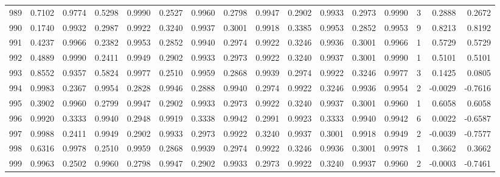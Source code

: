 \begin{tabular}{lrrrrrrrrrrrrrrr}
989 &      0.7102 &  0.9774 &  0.5298 &  0.9990 &  0.2527 &  0.9960 &  0.2798 &  0.9947 &  0.2902 &  0.9933 &   0.2973 &     0.9990 &      3 &                    0.2888 &                     0.2672 \\
990 &      0.1740 &  0.9932 &  0.2987 &  0.9922 &  0.3240 &  0.9937 &  0.3001 &  0.9918 &  0.3385 &  0.9953 &   0.2852 &     0.9953 &      9 &                    0.8213 &                     0.8192 \\
991 &      0.4237 &  0.9966 &  0.2382 &  0.9953 &  0.2852 &  0.9940 &  0.2974 &  0.9922 &  0.3246 &  0.9936 &   0.3001 &     0.9966 &      1 &                    0.5729 &                     0.5729 \\
992 &      0.4889 &  0.9990 &  0.2411 &  0.9949 &  0.2902 &  0.9933 &  0.2973 &  0.9922 &  0.3240 &  0.9937 &   0.3001 &     0.9990 &      1 &                    0.5101 &                     0.5101 \\
993 &      0.8552 &  0.9357 &  0.5824 &  0.9977 &  0.2510 &  0.9959 &  0.2868 &  0.9939 &  0.2974 &  0.9922 &   0.3246 &     0.9977 &      3 &                    0.1425 &                     0.0805 \\
994 &      0.9983 &  0.2367 &  0.9954 &  0.2828 &  0.9946 &  0.2888 &  0.9940 &  0.2974 &  0.9922 &  0.3246 &   0.9936 &     0.9954 &      2 &                   -0.0029 &                    -0.7616 \\
995 &      0.3902 &  0.9960 &  0.2799 &  0.9947 &  0.2902 &  0.9933 &  0.2973 &  0.9922 &  0.3240 &  0.9937 &   0.3001 &     0.9960 &      1 &                    0.6058 &                     0.6058 \\
996 &      0.9920 &  0.3333 &  0.9940 &  0.2948 &  0.9919 &  0.3338 &  0.9942 &  0.2991 &  0.9923 &  0.3333 &   0.9940 &     0.9942 &      6 &                    0.0022 &                    -0.6587 \\
997 &      0.9988 &  0.2411 &  0.9949 &  0.2902 &  0.9933 &  0.2973 &  0.9922 &  0.3240 &  0.9937 &  0.3001 &   0.9918 &     0.9949 &      2 &                   -0.0039 &                    -0.7577 \\
998 &      0.6316 &  0.9978 &  0.2510 &  0.9959 &  0.2868 &  0.9939 &  0.2974 &  0.9922 &  0.3246 &  0.9936 &   0.3001 &     0.9978 &      1 &                    0.3662 &                     0.3662 \\
999 &      0.9963 &  0.2502 &  0.9960 &  0.2798 &  0.9947 &  0.2902 &  0.9933 &  0.2973 &  0.9922 &  0.3240 &   0.9937 &     0.9960 &      2 &                   -0.0003 &                    -0.7461 \\
\bottomrule
\end{tabular}
